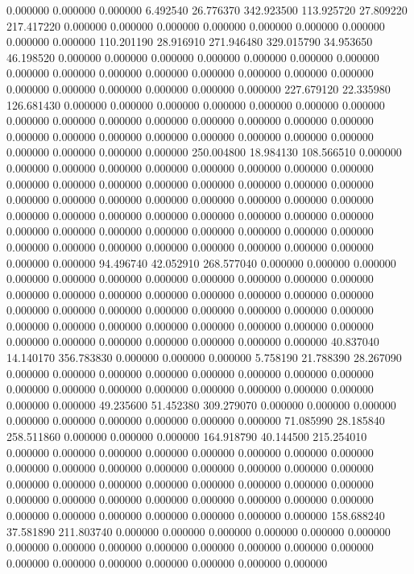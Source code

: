 0.000000 0.000000 0.000000
6.492540 26.776370 342.923500
113.925720 27.809220 217.417220
0.000000 0.000000 0.000000
0.000000 0.000000 0.000000
0.000000 0.000000 0.000000
110.201190 28.916910 271.946480
329.015790 34.953650 46.198520
0.000000 0.000000 0.000000
0.000000 0.000000 0.000000
0.000000 0.000000 0.000000
0.000000 0.000000 0.000000
0.000000 0.000000 0.000000
0.000000 0.000000 0.000000
0.000000 0.000000 0.000000
227.679120 22.335980 126.681430
0.000000 0.000000 0.000000
0.000000 0.000000 0.000000
0.000000 0.000000 0.000000
0.000000 0.000000 0.000000
0.000000 0.000000 0.000000
0.000000 0.000000 0.000000
0.000000 0.000000 0.000000
0.000000 0.000000 0.000000
0.000000 0.000000 0.000000
250.004800 18.984130 108.566510
0.000000 0.000000 0.000000
0.000000 0.000000 0.000000
0.000000 0.000000 0.000000
0.000000 0.000000 0.000000
0.000000 0.000000 0.000000
0.000000 0.000000 0.000000
0.000000 0.000000 0.000000
0.000000 0.000000 0.000000
0.000000 0.000000 0.000000
0.000000 0.000000 0.000000
0.000000 0.000000 0.000000
0.000000 0.000000 0.000000
0.000000 0.000000 0.000000
0.000000 0.000000 0.000000
0.000000 0.000000 0.000000
0.000000 0.000000 0.000000
0.000000 0.000000 0.000000
94.496740 42.052910 268.577040
0.000000 0.000000 0.000000
0.000000 0.000000 0.000000
0.000000 0.000000 0.000000
0.000000 0.000000 0.000000
0.000000 0.000000 0.000000
0.000000 0.000000 0.000000
0.000000 0.000000 0.000000
0.000000 0.000000 0.000000
0.000000 0.000000 0.000000
0.000000 0.000000 0.000000
0.000000 0.000000 0.000000
0.000000 0.000000 0.000000
0.000000 0.000000 0.000000
0.000000 0.000000 0.000000
40.837040 14.140170 356.783830
0.000000 0.000000 0.000000
5.758190 21.788390 28.267090
0.000000 0.000000 0.000000
0.000000 0.000000 0.000000
0.000000 0.000000 0.000000
0.000000 0.000000 0.000000
0.000000 0.000000 0.000000
0.000000 0.000000 0.000000
49.235600 51.452380 309.279070
0.000000 0.000000 0.000000
0.000000 0.000000 0.000000
0.000000 0.000000 0.000000
71.085990 28.185840 258.511860
0.000000 0.000000 0.000000
164.918790 40.144500 215.254010
0.000000 0.000000 0.000000
0.000000 0.000000 0.000000
0.000000 0.000000 0.000000
0.000000 0.000000 0.000000
0.000000 0.000000 0.000000
0.000000 0.000000 0.000000
0.000000 0.000000 0.000000
0.000000 0.000000 0.000000
0.000000 0.000000 0.000000
0.000000 0.000000 0.000000
0.000000 0.000000 0.000000
0.000000 0.000000 0.000000
0.000000 0.000000 0.000000
158.688240 37.581890 211.803740
0.000000 0.000000 0.000000
0.000000 0.000000 0.000000
0.000000 0.000000 0.000000
0.000000 0.000000 0.000000
0.000000 0.000000 0.000000
0.000000 0.000000 0.000000
0.000000 0.000000 0.000000
